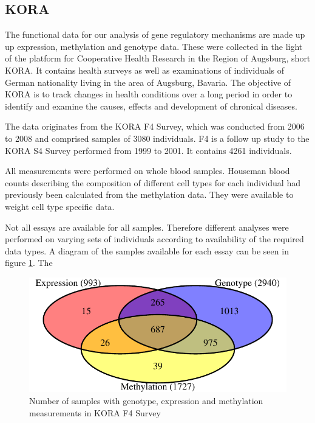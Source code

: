 \documentclass[a4paper,12pt]{article}
\begin{document}
\subsection{KORA}
The functional data for our analysis of gene regulatory mechanisms are made up up expression, methylation and genotype data. These were collected in the light of the platform for Cooperative Health Research in the Region of Augsburg, short KORA. It contains health surveys as well as examinations of individuals of German nationality living in the area of Augsburg, Bavaria.
The objective of KORA is to track changes in health conditions over a long period in order to identify and examine the causes, effects and development of chronical diseases.

The data originates from the KORA F4 Survey, which was conducted from 2006 to 2008 and comprised samples of 3080 individuals. F4 is a follow up study to the KORA S4 Survey performed from 1999 to 2001. It contains 4261 individuals. 

All measurements were performed on whole blood samples. Houseman blood counts\cite{10.3389/fgene.2016.00023} describing the composition of different cell types for each individual had previously been calculated from the methylation data. They were available to weight cell type specific data. 

Not all essays are available for all samples. Therefore different analyses were performed on varying sets of individuals according to availability of the required data types. A diagram of the samples available for each essay can be seen in figure \ref{fig:samples.venn}. The 

\begin{figure}[tb]
\begin{center}
	\includegraphics[scale = 1, keepaspectratio = true]{../figures/samples_venn}  
	\caption{Number of samples with genotype, expression and methylation measurements in KORA F4 Survey}
    \label{fig:samples.venn}
\end{center}
\end{figure}
\end{document}
